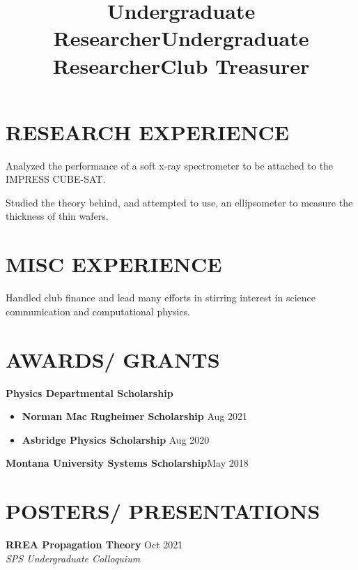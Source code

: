 \documentclass[margin]{res}
\begin{document}
\begin{resume}
\section{RESEARCH EXPERIENCE}
\title{\textbf{Undergraduate Researcher}}
\begin{position}
Analyzed the performance of a soft x-ray spectrometer to be attached to the IMPRESS CUBE-SAT. 
\end{position}
\title{\textbf{Undergraduate Researcher}}
\begin{position}
Studied the theory behind, and attempted to use, an ellipsometer to measure the thickness of thin wafers.
\end{position}


\section{MISC EXPERIENCE}
\title{\textbf{Club Treasurer}}
\begin{position}
Handled club finance and lead many efforts in stirring interest in science communication and computational physics. 
\end{position}


\section{AWARDS/ GRANTS}
\textbf{Physics Departmental Scholarship}
\begin{itemize}
\item \textbf{Norman Mac Rugheimer Scholarship} \hfill Aug 2021
\item \textbf{Asbridge Physics Scholarship} \hfill Aug 2020
\end{itemize}
\textbf{Montana University Systems Scholarship}\hfill\hfil May 2018


\section{POSTERS/ PRESENTATIONS}
\textbf{RREA Propagation Theory} \hfill Oct 2021\\
\textit{SPS Undergraduate Colloquium}
	

\end{resume}
\end{document}
